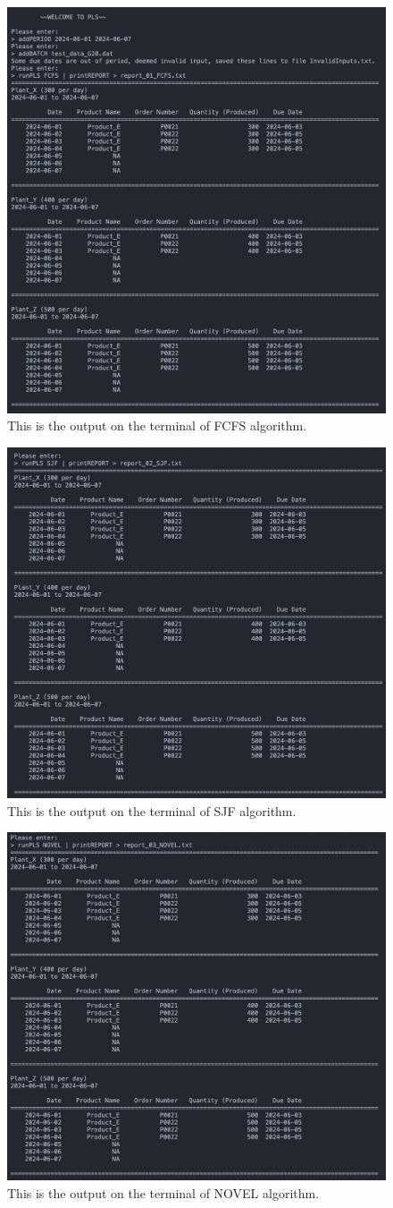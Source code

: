 \documentclass[conference]{IEEEtran}
\begin{document}
\begin{figure}[htbp]
\centering
\includegraphics[width=0.6\columnwidth]{Figures/1.jpg}
\caption{This is the output on the terminal of FCFS algorithm.}
\label{fig:FCFS}
\end{figure}

\begin{figure}[htbp]
\centering
\includegraphics[width=0.6\columnwidth]{Figures/2.jpg}
\caption{This is the output on the terminal of SJF algorithm.}
\label{fig:SJF}
\end{figure}

\begin{figure}[htbp]
\centering
\includegraphics[width=0.6\columnwidth]{Figures/3.jpg}
\caption{This is the output on the terminal of NOVEL algorithm.}
\label{fig:NOVEL}
\end{figure}
\end{document}
